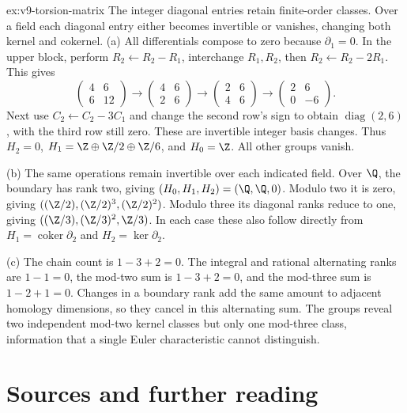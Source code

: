 \begin{solution}{ex:v9-torsion-matrix}
\idea The integer diagonal entries retain finite-order classes. Over a field each diagonal entry either becomes invertible or vanishes, changing both kernel and cokernel.
\writeup (a) All differentials compose to zero because $\partial_1=0$. In the upper block, perform $R_2\leftarrow R_2-R_1$, interchange $R_1,R_2$, then $R_2\leftarrow R_2-2R_1$. This gives
\[
\begin{pmatrix}4&6\\6&12\end{pmatrix}
\longrightarrow\begin{pmatrix}4&6\\2&6\end{pmatrix}
\longrightarrow\begin{pmatrix}2&6\\4&6\end{pmatrix}
\longrightarrow\begin{pmatrix}2&6\\0&-6\end{pmatrix}.
\]
Next use $C_2\leftarrow C_2-3C_1$ and change the second row's sign to obtain $\operatorname{diag}(2,6)$, with the third row still zero. These are invertible integer basis changes. Thus $H_2=0$, $H_1=\Z\oplus\Z/2\oplus\Z/6$, and $H_0=\Z$. All other groups vanish.

(b) The same operations remain invertible over each indicated field. Over $\Q$, the boundary has rank two, giving $(H_0,H_1,H_2)=(\Q,\Q,0)$. Modulo two it is zero, giving $((\Z/2),(\Z/2)^3,(\Z/2)^2)$. Modulo three its diagonal ranks reduce to one, giving $((\Z/3),(\Z/3)^2,\Z/3)$. In each case these also follow directly from $H_1=\operatorname{coker}\partial_2$ and $H_2=\ker\partial_2$.

(c) The chain count is $1-3+2=0$. The integral and rational alternating ranks are $1-1=0$, the mod-two sum is $1-3+2=0$, and the mod-three sum is $1-2+1=0$. Changes in a boundary rank add the same amount to adjacent homology dimensions, so they cancel in this alternating sum. The groups reveal two independent mod-two kernel classes but only one mod-three class, information that a single Euler characteristic cannot distinguish.
\end{solution}

\section*{Sources and further reading}

